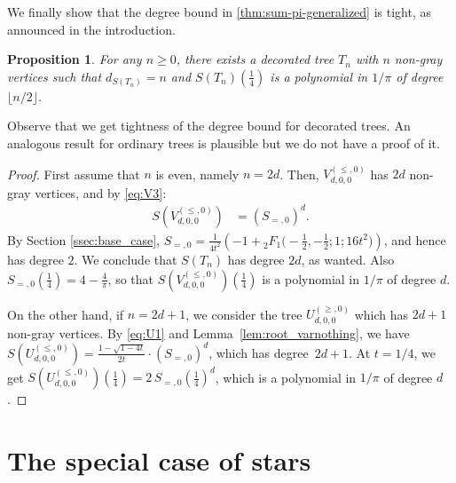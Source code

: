 \documentclass[12pt]{amsart}
\newcommand{\revision}[1]{{#1}}
\theoremstyle{plain}
\newtheorem{proposition}[lemma]{Proposition}
\theoremstyle{remark}
\begin{document}
We finally show that the degree bound in \cref{thm:sum-pi-generalized} is tight, as announced in the introduction.
\begin{proposition}
\label{prop:long stars maximize the degree}
For any $n \geq 0$, there exists a decorated tree $T_n$ with $n$ non-gray vertices
such that $d_{S(T_n)}=n$ and $S(T_n)(\frac14)$ is a polynomial in $1/\pi$ of degree $\lfloor n/2 \rfloor$.
\end{proposition}

\revision{Observe that we get tightness of the degree bound for decorated trees. An analogous result for ordinary trees is plausible but we do not have a proof of it.}

\begin{proof}
First assume that $n$ is even, namely $n=2d$. Then, $V_{d,0,0}^{(\leq,0)}$ has $2d$ non-gray vertices, and by \eqref{eq:V3}:
\begin{align*}
S(V_{d,0,0}^{(\leq,0)}) &= (S_{=,0})^d.
\end{align*}
By Section \ref{ssec:base_case}, $S_{=,0}=\frac{1}{4t^2}\left( -1+ {}_{2}^{}{{}{{}{F_{1}^{}}}}\big(-\tfrac12,-\tfrac12; 1; 16t^2\big)\right)$, and hence has degree $2$.
We conclude that $S(T_n)$ has degree $2d$, as wanted.
Also $S_{=,0}(\frac14)=4-\frac4{\pi}$, so that $S(V_{d,0,0}^{(\leq,0)})(\frac14)$
is a polynomial in $1/\pi$ of degree $d$.

On the other hand, if $n=2d+1$, we consider the tree $U_{d,0,0}^{(\geq,0)}$ 
which has $2d+1$ non-gray vertices.
 By \eqref{eq:U1} and Lemma~\ref{lem:root_varnothing}, we have $S(U_{d,0,0}^{(\leq,0)})=\frac{1-\sqrt{1-4t}}{2t} \cdot (S_{=,0})^d$, which has degree~$2d+1$.
 At $t=1/4$, we get $S(U_{d,0,0}^{(\leq,0)})(\frac14)=2 \, S_{=,0}(\frac14)^d$,
 which is a polynomial in $1/\pi$ of degree $d$.
\end{proof}

\section{The special case of stars}
\label{sec:stars}
\end{document}
